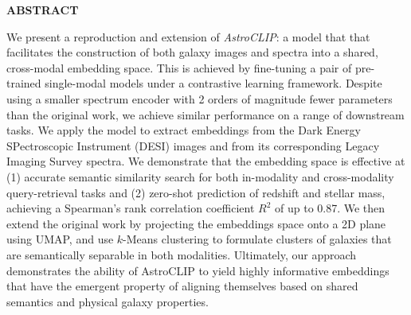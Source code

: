 \documentclass[a4paper,12pt]{article}
\begin{document}
    \newpage
    \begin{center}
        \textbf{ABSTRACT}
    \end{center}
    We present a reproduction and extension of \emph{AstroCLIP}: a model that that facilitates the construction of both galaxy images and spectra into a shared, cross-modal embedding space. This is achieved by fine-tuning a pair of pre-trained single-modal models under a contrastive learning framework. Despite using a smaller spectrum encoder with 2 orders of magnitude fewer parameters than the original work, we achieve similar performance on a range of downstream tasks. We apply the model to extract embeddings from the Dark Energy SPectroscopic Instrument (DESI) images and from its corresponding Legacy Imaging Survey spectra. We demonstrate that the embedding space is effective at (1) accurate semantic similarity search for both in-modality and cross-modality query-retrieval tasks and (2) zero-shot prediction of redshift and stellar mass, achieving a Spearman's rank correlation coefficient $R^2$ of up to 0.87. We then extend the original work by projecting the embeddings space onto a 2D plane using UMAP, and use $k$-Means clustering to formulate clusters of galaxies that are semantically separable in both modalities. Ultimately, our approach demonstrates the ability of AstroCLIP to yield highly informative embeddings that have the emergent property of aligning themselves based on shared semantics and physical galaxy properties.



    \newpage
    
    \tableofcontents
    
    \newpage





\end{document}
